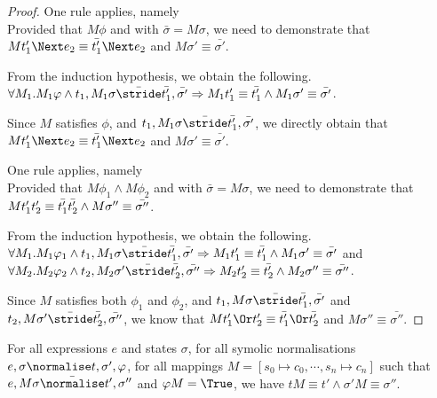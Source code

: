\begin{proof}
  {One rule applies, namely \\
  Provided that $M\phi$ and  with $\bar{\sigma}=M\sigma$,
  we need to demonstrate that $M t_1'\Next e_2\equiv \bar{t_1'}\Next e_2$ and $M \sigma'\equiv\bar{\sigma'}$.

  From the induction hypothesis, we obtain the following.\\
  $\forall M_1 . M_1 \phi \land t_1,M_1\sigma \bar{\stride} \bar{t_1'},\bar{\sigma'}\implies M_1 t_1'\equiv\bar{t_1'}\land M_1\sigma' \equiv \bar{\sigma'}$.

  Since $M$ satisfies $\phi$, and $t_1,M_1\sigma \bar{\stride} \bar{t_1'},\bar{\sigma'}$,
  we directly obtain that $M t_1'\Next e_2\equiv \bar{t_1'}\Next e_2$ and $M \sigma'\equiv\bar{\sigma'}$.

  }

  {One rule applies, namely \\
  Provided that $M\phi_1\land M\phi_2$ and  with $\bar{\sigma}=M\sigma$,
  we need to demonstrate that $M t_1'\relax t_2'\equiv \bar{t_1'}\relax\bar{t_2'} \land M\sigma''\equiv \bar{\sigma''}$.

  From the induction hypothesis, we obtain the following.\\
  $\forall M_1 . M_1 \phi_1 \land t_1,M_1\sigma \bar{\stride} \bar{t_1'},\bar{\sigma'}\implies M_1 t_1'\equiv\bar{t_1'}\land M_1\sigma' \equiv \bar{\sigma'}$ and \\
  $\forall M_2 . M_2 \phi_2 \land t_2,M_2\sigma' \bar{\stride} \bar{t_2'},\bar{\sigma''}\implies M_2 t_2'\equiv\bar{t_2'}\land M_2\sigma'' \equiv \bar{\sigma''}$.

  Since $M$ satisfies both $\phi_1$ and $\phi_2$, and $t_1,M\sigma \bar{\stride} \bar{t_1'},\bar{\sigma'}$ and $t_2,M\sigma'\bar{\stride}\bar{t_2'},\bar{\sigma''}$,
  we know that $M t_1'\Or t_2'\equiv \bar{t_1'}\Or\bar{t_2'}$ and $M\sigma''\equiv \bar{\sigma''}$.

  }

\end{proof}

\begin{lemma}
  \label{lem:soundnorm}

  For all expressions $e$ and states $\sigma$,
  for all symolic normalisations $e,\sigma\normalise t,\sigma',\phi$,
  for all mappings $M=[s_0\mapsto c_0,\cdots,s_n\mapsto c_n]$
  such that $e,M \sigma \bar{\normalise}t',\sigma''$ and $\phi M =\True$,
  we have $t M \equiv t' \wedge \sigma' M \equiv \sigma''$.

\end{lemma}


